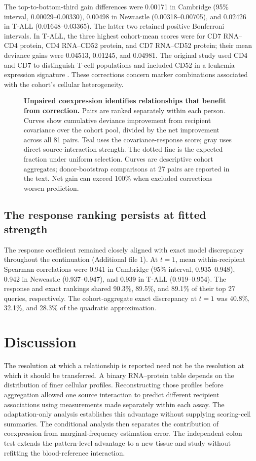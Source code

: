 \documentclass[pdflatex,sn-vancouver-num,iicol]{sn-jnl}
\begin{document}
The top-to-bottom-third gain differences were 0.00171 in Cambridge (95\%
interval, 0.00029--0.00330), 0.00498 in Newcastle (0.00318--0.00705), and
0.02426 in T-ALL (0.01648--0.03365). The latter two retained positive
Bonferroni intervals. In T-ALL, the three highest cohort-mean scores were for
CD7 RNA--CD4 protein, CD4 RNA--CD52 protein, and CD7 RNA--CD52 protein;
their mean deviance gains were 0.04513, 0.01245, and 0.04981. The original
study used CD4 and CD7 to distinguish T-cell populations and included CD52 in
a leukemia expression signature \cite{wiggers}. These corrections concern
marker combinations associated with the cohort's cellular heterogeneity.

\begin{figure}[t]
\centering

\caption{\textbf{Unpaired coexpression identifies relationships that benefit from correction.}
Pairs are ranked separately within each person. Curves show cumulative
deviance improvement from recipient covariance over the cohort pool, divided
by the net improvement across all 81 pairs. Teal uses the covariance-response
score; gray uses direct source-interaction strength. The dotted line is the
expected fraction under uniform selection. Curves are descriptive cohort
aggregates; donor-bootstrap comparisons at 27 pairs are reported in the text.
Net gain can exceed 100\% when excluded corrections worsen prediction.}
\label{fig:relationships}
\end{figure}

\subsection{The response ranking persists at fitted strength}
The response coefficient remained closely aligned with exact model discrepancy
throughout the continuation (Additional file 1). At $t=1$, mean
within-recipient Spearman correlations were 0.941 in Cambridge (95\% interval,
0.935--0.948), 0.942 in Newcastle (0.937--0.947), and 0.939 in T-ALL
(0.919--0.954). The response and exact rankings shared 90.3\%, 89.5\%, and
89.1\% of their top 27 queries, respectively. The cohort-aggregate exact
discrepancy at $t=1$ was 40.8\%, 32.1\%, and 28.3\% of the quadratic
approximation.

\section{Discussion}
The resolution at which a relationship is reported need not be the resolution
at which it should be transferred. A binary RNA--protein table depends on the
distribution of finer cellular profiles. Reconstructing those profiles before
aggregation allowed one source interaction to predict different recipient
associations using measurements made separately within each assay. The
adaptation-only analysis establishes this advantage without supplying
scoring-cell summaries. The conditional analysis then separates the
contribution of coexpression from marginal-frequency estimation error.
The independent colon test extends the pattern-level advantage to a new
tissue and study without refitting the blood-reference interaction.
\end{document}
